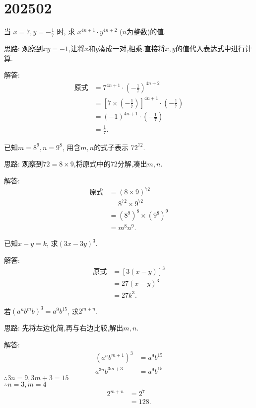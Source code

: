 \section{202502}

\item{
    当 $ x=7, y=-\frac{1}{7}$ 时, 求 $x^{4n+1}\cdot y^{4n+2}$ ($n$为整数)的值.

    \fangsong{}
    思路: 观察到$xy=-1$,让将$x$和$y$凑成一对,相乘.直接将$x, y$的值代入表达式中进行计算.
    
    解答: 
    \begin{align*}
        \mbox{原式} &= 7^{4n+1}\cdot \left(-\frac{1}{7}\right) ^{4n+2}\\
        &= [7\times(-\frac{1}{7})]^{4n+1} \cdot(-\frac{1}{7})\\
        &= (-1)^{4n+1} \cdot(-\frac{1}{7})\\
        &= \frac{1}{7}.
    \end{align*}
} 
\item{
    已知$ m=8^9, n=9^8 $, 用含$m, n$的式子表示 $72^{72}$.

    \fangsong{}
    思路: 观察到$72=8\times 9$,将原式中的72分解,凑出$m, n$.
    
    解答: 
    \begin{align*}
        \mbox{原式} &= (8\times 9)^{72}\\
        &= 8^{72}\times 9^{72}\\
        &= (8^9)^8\times (9^8)^9\\
        &= m^8 n^9.
    \end{align*}
} 
\item{
    已知$x-y=k$, 求$(3x-3y)^3.$

    \fangsong{}
    解答: 
    \begin{align*}
        \mbox{原式} &= [3(x-y)]^3\\
        &= 27(x-y)^3\\
        &= 27k^3.
    \end{align*}
} 
\item{
    若$(a^nb^mb)^3 = a^9 b^{15}$, 求$2^{m+n}$.

    \fangsong{}
    思路: 先将左边化简,再与右边比较,解出$m,n$.
    
    解答: 
    \begin{align*}
        (a^nb^{m+1})^3 &= a^9b^{15}\\
        a^{3n}b^{3m+3} &= a^9b^{15}
    \end{align*}
    $\therefore 3n=9, 3m+3=15$\\
    $\therefore n=3, m=4$
    \begin{align*}
        2^{m+n} &= 2^7\\
        &= 128.
    \end{align*}
}
